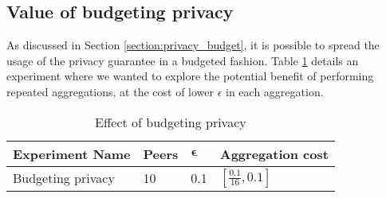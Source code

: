
\subsection{Value of budgeting privacy}
 
As discussed in Section \ref{section:privacy_budget}, it is possible to spread the usage of the privacy guarantee in a budgeted fashion. Table \ref{tab:experiments_budgeting_privacy} details an experiment where we wanted to explore the potential benefit of performing repeated aggregations, at the cost of lower $\epsilon$ in each aggregation.

\begin{table}[h]
	\centering	
	\begin{tabular}{|l|l|l|l|}
		{\bf Experiment Name} & {\bf Peers} & $\boldsymbol{\epsilon}$ & {\bf Aggregation cost}        \\
		\hline
		Budgeting privacy & 10    & 0.1     & $[\frac{0.1}{16}, 0.1]$
	\end{tabular}
	\caption{Effect of budgeting privacy}
	\label{tab:experiments_budgeting_privacy}
\end{table}
